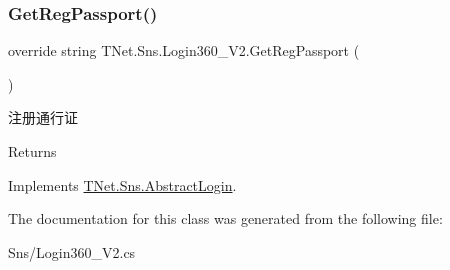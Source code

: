 \subsubsection{\texorpdfstring{Get\+Reg\+Passport()}{GetRegPassport()}}
{\footnotesize\ttfamily override string T\+Net.\+Sns.\+Login360\+\_\+\+V2.\+Get\+Reg\+Passport (\begin{DoxyParamCaption}{ }\end{DoxyParamCaption})\hspace{0.3cm}{\ttfamily [virtual]}}



注册通行证 

\begin{DoxyReturn}{Returns}

\end{DoxyReturn}


Implements \mbox{\hyperlink{class_t_net_1_1_sns_1_1_abstract_login_a3930eb564bb4804e1b646d749f20907a}{T\+Net.\+Sns.\+Abstract\+Login}}.



The documentation for this class was generated from the following file\+:\begin{DoxyCompactItemize}
\item 
Sns/Login360\+\_\+\+V2.\+cs\end{DoxyCompactItemize}

